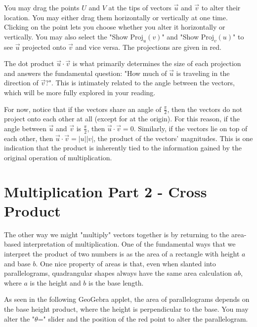 \documentclass{ximera}
\begin{document}
You may drag the points $U$ and $V$ at the tips of vectors $\vec u$ and $\vec v$ to alter their location. You may either drag them horizontally or vertically at one time. Clicking on the point lets you choose whether you alter it horizontally or vertically. You may also select the "Show $\text{Proj}_u(v)$" and "Show $\text{Proj}_v(u)$" to see $\vec u$ projected onto $\vec v$ and vice versa. The projections are given in red.

\begin{center}
\end{center}

The dot product $\vec u\cdot\vec v$ is what primarily determines the size of each projection and answers the fundamental question: "How much of $\vec u$ is traveling in the direction of $\vec v$?". This is intimately related to the angle between the vectors, which will be more fully explored in your reading.

For now, notice that if the vectors share an angle of $\frac{\pi}{2}$, then the vectors do not project onto each other at all (except for at the origin). For this reason, if the angle between $\vec u$ and $\vec v$ is $\frac{\pi}{2}$, then $\vec u\cdot\vec v=0$. Similarly, if the vectors lie on top of each other, then $\vec u\cdot\vec v=|u||v|$, the product of the vectors' magnitudes. This is one indication that the product is inherently tied to the information gained by the original operation of multiplication.

\section{Multiplication Part 2 - Cross Product}

The other way we might "multiply" vectors together is by returning to the area-based interpretation of multiplication. One of the fundamental ways that we interpret the product of two numbers is as the area of a rectangle with height $a$ and base $b$. One nice property of areas is that, even when slanted into parallelograms, quadrangular shapes always have the same area calculation $ab$, where $a$ is the height and $b$ is the base length.

As seen in the following GeoGebra applet, the area of parallelograms depends on the base height product, where the height is perpendicular to the base. You may alter the "$\theta$=" slider and the position of the red point to alter the parallelogram.

\begin{center}
\end{center}
\end{document}
